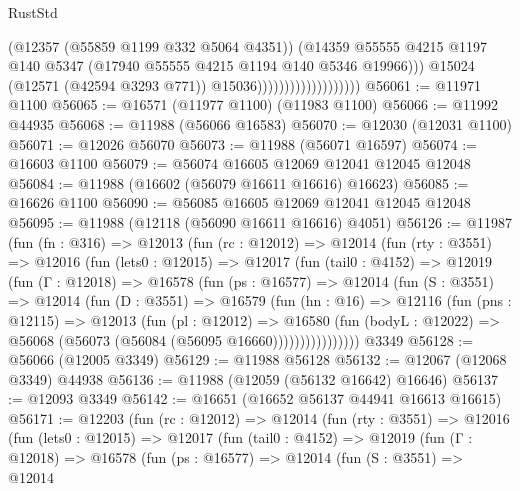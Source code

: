 \begin{lexlean}{RustStd}
\begin{coremodule}
                                            (@12357 (@55859 @1199 @332 @5064 @4351))
                                            (@14359
                                              @55555
                                              @4215
                                              @1197
                                              @140
                                              @5347
                                              (@17940 @55555 @4215 @1194 @140 @5346 @19966)))
                                          @15024
                                          (@12571 (@42594 @3293 @771))
                                          @15036)))))))))))))))))))
@56061 := @11971 @1100
@56065 := @16571 (@11977 @1100) (@11983 @1100)
@56066 := @11992 @44935
@56068 := @11988 (@56066 @16583)
@56070 := @12030 (@12031 @1100)
@56071 := @12026 @56070
@56073 := @11988 (@56071 @16597)
@56074 := @16603 @1100
@56079 := @56074 @16605 @12069 @12041 @12045 @12048
@56084 := @11988 (@16602 (@56079 @16611 @16616) @16623)
@56085 := @16626 @1100
@56090 := @56085 @16605 @12069 @12041 @12045 @12048
@56095 := @11988 (@12118 (@56090 @16611 @16616) @4051)
@56126 := @11987
    (fun (fn : @316) =>
    @12013
      (fun (rc : @12012) =>
      @12014
        (fun (rty : @3551) =>
        @12016
          (fun (lets0 : @12015) =>
          @12017
            (fun (tail0 : @4152) =>
            @12019
              (fun (Γ : @12018) =>
              @16578
                (fun (ps : @16577) =>
                @12014
                  (fun (S : @3551) =>
                  @12014
                    (fun (D : @3551) =>
                    @16579
                      (fun (hn : @16) =>
                      @12116
                        (fun (pns : @12115) =>
                        @12013
                          (fun (pl : @12012) =>
                          @16580
                            (fun (bodyL : @12022) =>
                            @56068 (@56073 (@56084 (@56095 @16660))))))))))))))))
    @3349
@56128 := @56066 (@12005 @3349)
@56129 := @11988 @56128
@56132 := @12067 (@12068 @3349) @44938
@56136 := @11988 (@12059 (@56132 @16642) @16646)
@56137 := @12093 @3349
@56142 := @16651 (@16652 @56137 @44941 @16613 @16615)
@56171 := @12203
    (fun (rc : @12012) =>
    @12014
      (fun (rty : @3551) =>
      @12016
        (fun (lets0 : @12015) =>
        @12017
          (fun (tail0 : @4152) =>
          @12019
            (fun (Γ : @12018) =>
            @16578
              (fun (ps : @16577) =>
              @12014
                (fun (S : @3551) =>
                @12014

\end{coremodule}
\end{lexlean}

